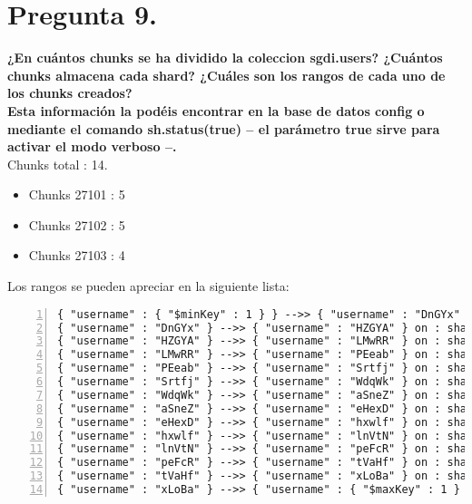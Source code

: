 \documentclass{article}
\begin{document}
  \section{Pregunta 9.}
  \textbf{¿En cuántos chunks se ha dividido la coleccion sgdi.users?
  ¿Cuántos chunks almacena cada shard? ¿Cuáles son los rangos de cada uno
  de los chunks creados?\\
  Esta información la podéis encontrar en la base de datos config o mediante
  el comando sh.status(true) – el parámetro true sirve para activar
  el modo verboso –.\\}
  Chunks total : 14.
  \begin{itemize}
    \item Chunks 27101 : 5
    \item Chunks 27102 : 5
    \item Chunks 27103 : 4
  \end{itemize}
  Los rangos se pueden apreciar en la siguiente lista:
  \begin{lstlisting}[numbers=left, basicstyle=\tiny]
{ "username" : { "$minKey" : 1 } } -->> { "username" : "DnGYx" } on : shard0001 Timestamp(2, 0) 
{ "username" : "DnGYx" } -->> { "username" : "HZGYA" } on : shard0002 Timestamp(3, 0) 
{ "username" : "HZGYA" } -->> { "username" : "LMwRR" } on : shard0001 Timestamp(4, 0) 
{ "username" : "LMwRR" } -->> { "username" : "PEeab" } on : shard0002 Timestamp(5, 0) 
{ "username" : "PEeab" } -->> { "username" : "Srtfj" } on : shard0001 Timestamp(6, 0) 
{ "username" : "Srtfj" } -->> { "username" : "WdqWk" } on : shard0002 Timestamp(7, 0) 
{ "username" : "WdqWk" } -->> { "username" : "aSneZ" } on : shard0001 Timestamp(8, 0) 
{ "username" : "aSneZ" } -->> { "username" : "eHexD" } on : shard0002 Timestamp(9, 0) 
{ "username" : "eHexD" } -->> { "username" : "hxwlf" } on : shard0001 Timestamp(10, 0) 
{ "username" : "hxwlf" } -->> { "username" : "lnVtN" } on : shard0000 Timestamp(10, 1) 
{ "username" : "lnVtN" } -->> { "username" : "peFcR" } on : shard0000 Timestamp(1, 10) 
{ "username" : "peFcR" } -->> { "username" : "tVaHf" } on : shard0000 Timestamp(1, 11) 
{ "username" : "tVaHf" } -->> { "username" : "xLoBa" } on : shard0000 Timestamp(1, 12) 
{ "username" : "xLoBa" } -->> { "username" : { "$maxKey" : 1 } } on : shard0000 Timestamp(1, 13) 
  \end{lstlisting}


  \newpage
\end{document}
